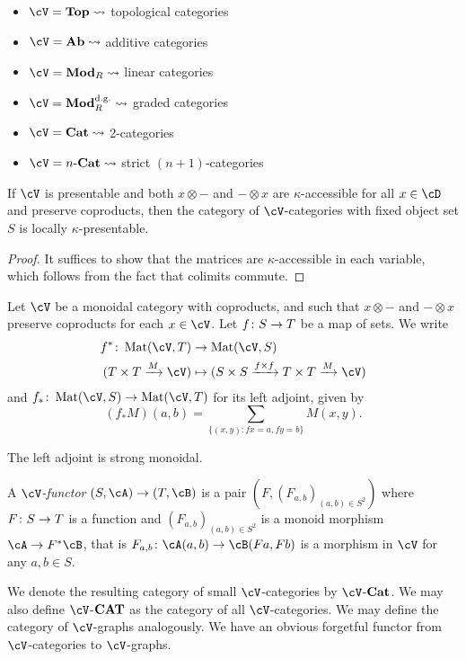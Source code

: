 \documentclass[a4paper,11pt,oneside,openany]{scrbook}
\begin{document}
\begin{exmp}
	\begin{itemize}
		\item $\cV= \Top \leadsto $ topological categories
		\item $\cV= \Ab \leadsto $ additive categories
		\item $\cV= \Mod_R \leadsto $ linear categories
		\item $\cV= \Mod_R^{\text{d.g.}} \leadsto $ graded categories
		\item $\cV= \Cat \leadsto $ 2-categories
		\item $\cV= n\text{-}\Cat \leadsto $ strict $ (n+1) $-categories
	\end{itemize}
\end{exmp}
\begin{prop}
	If $\cV$ is presentable and both $ x\otimes - $ and $ - \otimes x $ are $ \kappa $-accessible for all $ x\in \cD $ and preserve coproducts, then the category of $\cV$-categories with fixed object set $ S $ is locally $ \kappa $-presentable.
\end{prop}
\begin{proof}
	It suffices to show that the matrices are $ \kappa $-accessible in each variable, which follows from the fact that colimits commute.
\end{proof}
\begin{defn}
	Let $\cV$ be a monoidal category with coproducts, and such that $
		x\otimes - $ and $ - \otimes x $ preserve coproducts for each $ x \in\cV$.
	Let $ f \colon S \to T $ be a map of sets.
	We write
	\begin{align*}
		f^* \from \Mat(\cV ,T)          & \to \Mat(\cV, S)                                                            \\
		( T\times T \xrightarrow{M}\cV) & \mapsto ( S\times S \xrightarrow{f \times  f} T\times T \xrightarrow{M}\cV)
	\end{align*}
	and $ f_* \from \Mat(\cV,S)\to \Mat(\cV,T) $ for its left adjoint, given by
	\begin{displaymath}
		(f_* M)(a,b) = \sum_{\{(x,y)\colon fx = a, fy = b \} }M(x,y).
	\end{displaymath}
\end{defn}
\begin{prop}
	The left adjoint is strong monoidal.
\end{prop}
\begin{defn}
	A $\cV$\emph{-functor} $ (S,\cA) \to (T,\cB) $ is a pair
	$ (F, (F_{a,b})_{(a,b) \in S^2}) $ where $ F\colon S \to T $ is a function and $ (F_{a,b})_{(a,b) \in S^2} $ is a monoid morphism $ \cA \to F^*\cB $, that is $ F_{a,b}\from \cA (a,b) \to \cB (Fa,Fb) $ is a morphism in $\cV$ for any $ a,b \in S $.

	We denote the resulting category of small $\cV$-categories by $\cV$-$ {\normalfont\textbf{Cat}} $. We may also define $\cV$-$ {\normalfont\textbf{CAT}} $ as the category of all $\cV$-categories.
	We may define the category of $\cV$-graphs analogously. We have an
	obvious forgetful functor from $\cV$-categories to $\cV$-graphs.
\end{defn}
\end{document}
